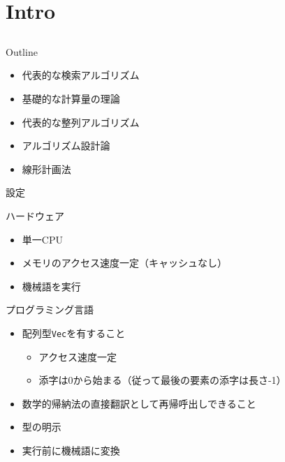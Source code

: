 \documentclass{beamer}
\subtitle{}
\begin{document}
\begin{frame}[fragile]{}
\titlepage
\end{frame}

\section{Intro}		%
\subsection{}

\begin{frame}[fragile]{Outline}{}
\begin{itemize}\itemsep8pt
\item 代表的な検索アルゴリズム
\item 基礎的な計算量の理論
\item 代表的な整列アルゴリズム
\item アルゴリズム設計論
\item 線形計画法
\end{itemize}
\end{frame}

\begin{frame}[fragile]{設定}{}

\begin{exampleblock}{ハードウェア}
\begin{itemize}%
\item 単一CPU
\item メモリのアクセス速度一定（キャッシュなし）
\item 機械語を実行
\end{itemize}
\end{exampleblock}

\begin{exampleblock}{プログラミング言語}
\begin{itemize}%
\item 配列型{\tt Vec}を有すること
\begin{itemize}%
\item アクセス速度一定
\item 添字は0から始まる（従って最後の要素の添字は長さ-1）
\end{itemize}
\item 数学的帰納法の直接翻訳として再帰呼出しできること
\item 型の明示
\item 実行前に機械語に変換
\end{itemize}
\end{exampleblock}
\end{frame}
\end{document}
